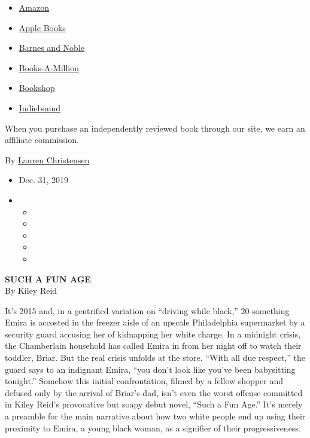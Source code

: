 \begin{itemize}
\tightlist
\item
  \href{https://www.amazon.com/gp/search?index=books\&tag=NYTBSREV-20\&field-keywords=Such+a+Fun+Age+Kiley+Reid}{Amazon}
\item
  \href{https://du-gae-books-dot-nyt-du-prd.appspot.com/buy?title=Such+a+Fun+Age\&author=Kiley+Reid}{Apple
  Books}
\item
  \href{https://www.anrdoezrs.net/click-7990613-11819508?url=https\%3A\%2F\%2Fwww.barnesandnoble.com\%2Fw\%2F\%3Fean\%3D9780525541905}{Barnes
  and Noble}
\item
  \href{https://www.anrdoezrs.net/click-7990613-35140?url=https\%3A\%2F\%2Fwww.booksamillion.com\%2Fp\%2FSuch\%2Ba\%2BFun\%2BAge\%2FKiley\%2BReid\%2F9780525541905}{Books-A-Million}
\item
  \href{https://bookshop.org/a/3546/9780525541905}{Bookshop}
\item
  \href{https://www.indiebound.org/book/9780525541905?aff=NYT}{Indiebound}
\end{itemize}

When you purchase an independently reviewed book through our site, we
earn an affiliate commission.

By
\href{https://www.nytimes3xbfgragh.onion/by/lauren-christensen}{Lauren
Christensen}

\begin{itemize}
\item
  Dec. 31, 2019
\item
  \begin{itemize}
  \item
  \item
  \item
  \item
  \item
  \end{itemize}
\end{itemize}

\textbf{SUCH A FUN AGE}\\
By Kiley Reid

It's 2015 and, in a gentrified variation on ``driving while black,''
20-something Emira is accosted in the freezer aisle of an upscale
Philadelphia supermarket by a security guard accusing her of kidnapping
her white charge. In a midnight crisis, the Chamberlain household has
called Emira in from her night off to watch their toddler, Briar. But
the real crisis unfolds at the store. ``With all due respect,'' the
guard says to an indignant Emira, ``you don't look like you've been
babysitting tonight.'' Somehow this initial confrontation, filmed by a
fellow shopper and defused only by the arrival of Briar's dad, isn't
even the worst offense committed in Kiley Reid's provocative but soapy
debut novel, ``Such a Fun Age.'' It's merely a preamble for the main
narrative about how two white people end up using their proximity to
Emira, a young black woman, as a signifier of their progressiveness.

